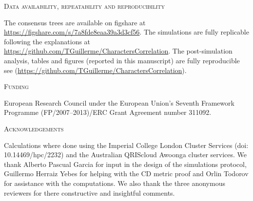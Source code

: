 \documentclass[12pt,letterpaper]{article}
\renewcommand{\section}[1]{%
\bigskip
\begin{center}
\begin{Large}
\normalfont\scshape #1
\medskip
\end{Large}
\end{center}}
\begin{document}
\section{Data availability, repeatability and reproducibility}
The consensus trees are available on figshare at \url{https://figshare.com/s/7a8fde8eaa39a3d3cf56}.
The simulations are fully replicable following the explanations at \url{https://github.com/TGuillerme/CharactersCorrelation}.
The post-simulation analysis, tables and figures (reported in this manuscript) are fully reproducible see (\url{https://github.com/TGuillerme/CharactersCorrelation}).

\section{Funding}
European Research Council under the European Union’s Seventh Framework Programme (FP/2007–2013)/ERC Grant Agreement number 311092.

\section{Acknowledgements}
Calculations where done using the Imperial College London Cluster Services (doi: 10.14469/hpc/2232) and the Australian QRIScloud Awoonga cluster services. We thank Alberto Pascual Garcia for input in the design of the simulations protocol, Guillermo Herraiz Yebes for helping with the CD metric proof and Orlin Todorov for assistance with the computations. We also thank the three anonymous reviewers for there constructive and insightful comments.



\end{document}
